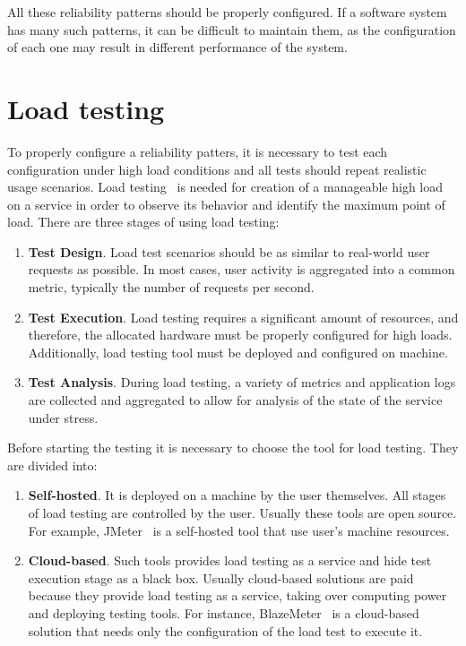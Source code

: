 All these reliability patterns should be properly configured. If a software system has many such patterns, it can be difficult to maintain them, as the configuration of each one may result in different performance of the system.

\section{Load testing}\label{sec:load-testing}
To properly configure a reliability patters, it is necessary to test each configuration under high load conditions and all tests should repeat realistic usage scenarios. Load testing~\cite{load_testing_tips} is needed for creation of a manageable high load on a service in order to observe its behavior and identify the maximum point of load. There are three stages of using load testing:

\begin{enumerate}
    \item \textbf{Test Design}. Load test scenarios should be as similar to real-world user requests as possible. In most cases, user activity is aggregated into a common metric, typically the number of requests per second.
    \item \textbf{Test Execution}. Load testing requires a significant amount of resources, and therefore, the allocated hardware must be properly configured for high loads. Additionally, load testing tool must be deployed and configured on machine.
    \item \textbf{Test Analysis}. During load testing, a variety of metrics and application logs are collected and aggregated to allow for analysis of the state of the service under stress.
\end{enumerate}

Before starting the testing it is necessary to choose the tool for load testing. They are divided into:
\begin{enumerate}
    \item \textbf{Self-hosted}. It is deployed on a machine by the user themselves. All stages of load testing are controlled by the user. Usually these tools are open source. For example, JMeter~\cite{jmeter} is a self-hosted tool that use user's machine resources.
    \item \textbf{Cloud-based}. Such tools provides load testing as a service and hide test execution stage as a black box. Usually cloud-based solutions are paid because they provide load testing as a service, taking over computing power and deploying testing tools. For instance, BlazeMeter~\cite{blazemeter} is a cloud-based solution that needs only the configuration of the load test to execute it.
\end{enumerate}

